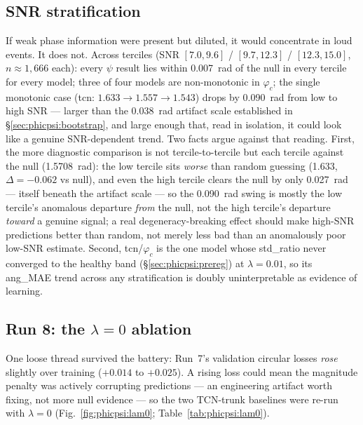 \subsection{SNR stratification}
\label{sec:phicpsi:snr}

If weak phase information were present but diluted, it would concentrate in loud events.
It does not.
Across terciles (SNR $[7.0, 9.6]$ / $[9.7, 12.3]$ / $[12.3, 15.0]$, $n \approx 1{,}666$ each): every $\psi$ result lies within \SI{0.007}{\radian} of the null in every tercile for every model; three of four models are non-monotonic in $\varphi_c$; the single monotonic case (tcn: $1.633 \to 1.557 \to 1.543$) drops by \SI{0.090}{\radian} from low to high SNR --- larger than the \SI{0.038}{\radian} artifact scale established in \S\ref{sec:phicpsi:bootstrap}, and large enough that, read in isolation, it could look like a genuine SNR-dependent trend.
Two facts argue against that reading.
First, the more diagnostic comparison is not tercile-to-tercile but each tercile against the null (\SI{1.5708}{\radian}): the low tercile sits \emph{worse} than random guessing (1.633, $\Delta = -0.062$ vs null), and even the high tercile clears the null by only \SI{0.027}{\radian} --- itself beneath the artifact scale --- so the \SI{0.090}{\radian} swing is mostly the low tercile's anomalous departure \emph{from} the null, not the high tercile's departure \emph{toward} a genuine signal; a real degeneracy-breaking effect should make high-SNR predictions better than random, not merely less bad than an anomalously poor low-SNR estimate.
Second, tcn/$\varphi_c$ is the one model whose std\_ratio never converged to the healthy band (\S\ref{sec:phicpsi:prereg}) at $\lambda = 0.01$, so its ang\_MAE trend across any stratification is doubly uninterpretable as evidence of learning.

\subsection{Run 8: the $\lambda = 0$ ablation}
\label{sec:phicpsi:ablation}

One loose thread survived the battery: Run~7's validation circular losses \emph{rose} slightly over training ($+0.014$ to $+0.025$).
A rising loss could mean the magnitude penalty was actively corrupting predictions --- an engineering artifact worth fixing, not more null evidence --- so the two TCN-trunk baselines were re-run with $\lambda = 0$ (Fig.~\ref{fig:phicpsi:lam0}; Table~\ref{tab:phicpsi:lam0}).

